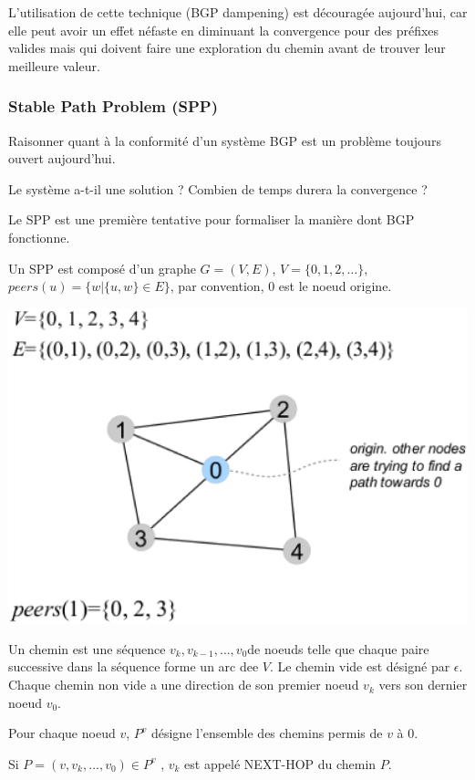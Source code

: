 \documentclass{report}
\begin{document}
L'utilisation de cette technique (BGP dampening) est découragée
aujourd'hui, car elle peut avoir un effet néfaste en diminuant la
convergence pour des préfixes valides mais qui doivent faire une
exploration du chemin avant de trouver leur meilleure valeur.

\subsubsection{Stable Path Problem (SPP)}

Raisonner quant à la conformité d'un système BGP est un problème
toujours ouvert aujourd'hui.

Le système a-t-il une solution ? Combien de temps durera la
convergence ?

Le SPP est une première tentative pour formaliser la manière dont BGP
fonctionne.

Un SPP est composé d'un graphe $G=(V, E)$, $V = \{0,1,2,\dots\}$,
$peers(u)=\{w|\{u,w\} \in E\}$, par convention, $0$ est le noeud
origine.

\includegraphics[width=\textwidth]{sppex1.eps}

Un chemin est une séquence $v_k, v_{k-1}, \dots, v_0$de noeuds telle
que chaque paire successive dans la séquence forme un arc dee $V$. Le
chemin vide est désigné par $\epsilon$. Chaque chemin non vide a une
direction de son premier noeud $v_k$ vers son dernier noeud $v_0$.

Pour chaque noeud $v$, $P^v$ désigne l'ensemble des chemins permis de
$v$ à $0$.

Si $P = (v, v_k, \dots, v_0) \in P^v$ , $v_k$ est appelé NEXT-HOP du
chemin $P$.
\end{document}
